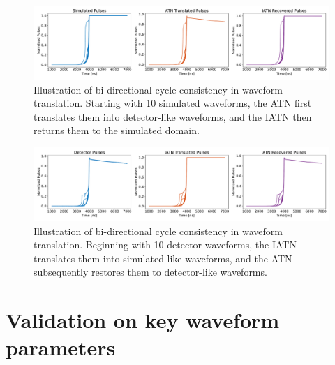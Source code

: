 \begin{figure}%
    \centering
    \includegraphics[width=0.99\linewidth]{ch8/figs/SEP_result_comp_1x3_cycle_BAB.pdf}
    \caption{Illustration of bi-directional cycle consistency in waveform translation. Starting with 10 simulated waveforms, the ATN first translates them into detector-like waveforms, and the IATN then returns them to the simulated domain.}
    \label{fig:cycle_bab}
\end{figure}

\begin{figure}%
    \centering
    \includegraphics[width=0.99\linewidth]{ch8/figs/SEP_result_comp_1x3_cycle_ABA.pdf}
    \caption{Illustration of bi-directional cycle consistency in waveform translation. Beginning with 10 detector waveforms, the IATN translates them into simulated-like waveforms, and the ATN subsequently restores them to detector-like waveforms.}
    \label{fig:cycle_aba}
\end{figure}

\section{Validation on key waveform parameters}
